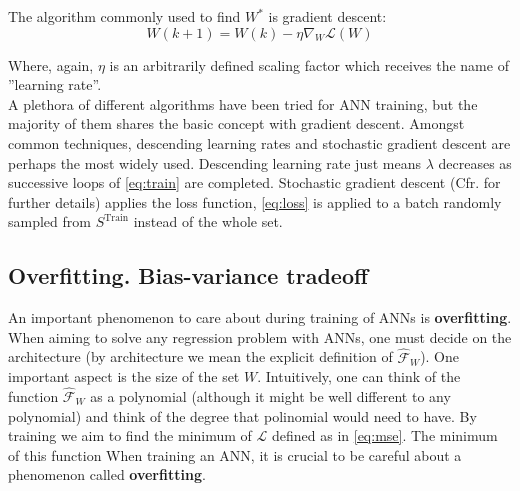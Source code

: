 The algorithm commonly used to find $W^*$ is gradient descent:
\begin{equation}\label{eq:train}
	W(k+1)=W(k)-\eta\nabla_W\mathcal{L}(W)
\end{equation}

Where, again, $\eta$ is an arbitrarily defined scaling factor which receives the name of ''learning rate''.\\
%
\indent A plethora of different algorithms have been tried for ANN training, but the majority of them shares the basic concept with gradient descent. Amongst common techniques, descending learning rates and stochastic gradient descent are perhaps the most widely used. Descending learning rate just means $\lambda$ decreases as successive loops of \cref{eq:train} are completed. Stochastic gradient descent (Cfr. \cite{Marsland2015Machine} for further details) applies the loss function, \cref{eq:loss} is applied to a batch randomly sampled from $S^\text{Train}$ instead of the whole set.
%
\subsection{Overfitting. Bias-variance tradeoff}
\indent An important phenomenon to care about during training of ANNs is \textbf{overfitting}. When aiming to solve any regression problem with ANNs, one must decide on the architecture (by architecture we mean the explicit definition of $\mathcal{\hat{F}}_W$). One important aspect is the size of the set $W$. Intuitively, one can think of the function $\mathcal{\hat{F}}_W$ as a polynomial (although it might be well different to any polynomial) and think of the degree that polinomial would need to have. By training we aim to find the minimum of $\mathcal{L}$ defined as in \cref{eq:mse}. The minimum of this function 
%
\indent When training an ANN, it is crucial to be careful about a phenomenon called \textbf{overfitting}. 

